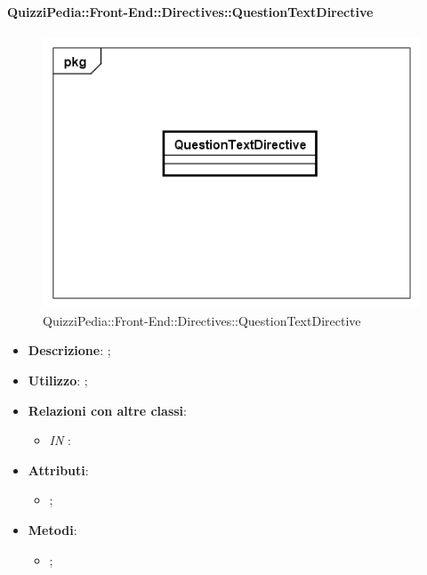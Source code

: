 \paragraph{QuizziPedia::Front-End::Directives::QuestionTextDirective}

\label{QuizziPedia::Front-End::Directives::QuestionTextDirective}

\begin{figure}[h]
	\centering
	\includegraphics[scale=0.5,keepaspectratio]{UML/Classi/Front-End/QuizziPedia_Front-end_Directives_QuestionTextDirective.png}
	\caption{QuizziPedia::Front-End::Directives::QuestionTextDirective}
\end{figure}

\begin{itemize}
	\item \textbf{Descrizione}: ;
	\item \textbf{Utilizzo}: ;
	\item \textbf{Relazioni con altre classi}: 
	\begin{itemize}
		\item \textit{IN} \texttt{}: 
	\end{itemize}
	\item \textbf{Attributi}: 
	\begin{itemize}
		\item ;
	\end{itemize}
	\item \textbf{Metodi}: 
	\begin{itemize}
		\item ;
	\end{itemize}
\end{itemize}

